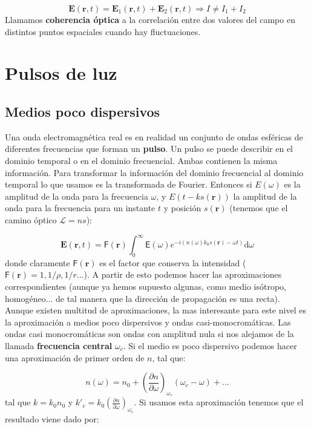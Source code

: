 \documentclass[12pt,a4paper]{book}
\numberwithin{equation}{section}
\numberwithin{figure}{section}
\newcommand{\parentesis}[1]{\left( #1  \right)}
\newcommand{\parciales}[2]{\frac{\partial #1}{\partial #2}}
\newcommand{\D}{\mathrm{d}}
\newcommand{\1}{_{(1)}}
\newcommand{\2}{_{(2)}}
\newcommand{\rn}{\mathbf{r}}
\newcommand{\En}{\mathbf{E}}
\theoremstyle{definition}
\begin{document}
$$\En (\rn,t) = \En_1 (\rn,t) + \En_2 (\rn,t) \Longrightarrow I \neq I_1 + I_2$$
Llamamos \textbf{coherencia óptica} a la correlación entre dos valores del campo en distintos puntos espaciales cuando hay fluctuaciones. \\


\section{Pulsos de luz}

\subsection{Medios poco dispersivos}

Una onda electromagnética real es en realidad un conjunto de ondas esféricas de diferentes frecuencias que forman un \textbf{pulso}. Un pulso se puede describir en el dominio temporal o en el dominio frecuencial. Ambas contienen la misma información. Para transformar la información del dominio frecuencial al dominio temporal lo que usamos es la transformada de Fourier. Entonces si $E(\omega)$ es la amplitud de la onda para la frecuencia $\omega$, y $E(t-ks(\rn))$ la amplitud de la onda para la frecuencia para un instante $t$ y posición $s(\rn)$ (tenemos que el camino óptico $\mathcal{L}=ns$): 

\begin{equation}
\En (\rn,t) = \mathsf{F} (\rn) \int_0^\infty \mathbf{\mathsf{E}} (\omega) e^{-i (n(\omega)k_0 s(\rn) - \omega t )} \D \omega
\end{equation}
donde claramente $\mathsf{F} (\rn) $ es el factor que conserva la intensidad ($\mathsf{F} (\rn) = 1,1/\rho,1/r...$). A partir de esto podemos hacer las aproximaciones correspondientes  (aunque ya hemos supuesto algunas, como medio isótropo, homogéneo... de tal manera que la dirección de propagación es una recta). \\

Aunque existen multitud de aproximaciones, la mas interesante para este nivel es la aproximación a medios poco dispersivos y ondas casi-monocromáticas. Las ondas casi monocromáticas son ondas con amplitud nula si nos alejamos de la llamada \textbf{frecuencia central} $\omega_c$. Si el medio es poco dispersivo podemos hacer una aproximación de primer orden de $n$, tal que:

\begin{equation}
n(\omega) = n_0 +  \parentesis{\parciales{n}{\omega}}_{\omega_c} (\omega_c - \omega) + \ldots
\end{equation}
tal que $k = k_0 n_0$ y $k'_c = k_0 \parentesis{\parciales{n}{\omega}}_{\omega_c}$. Si usamos esta aproximación tenemos que el resultado viene dado por:
\end{document}
